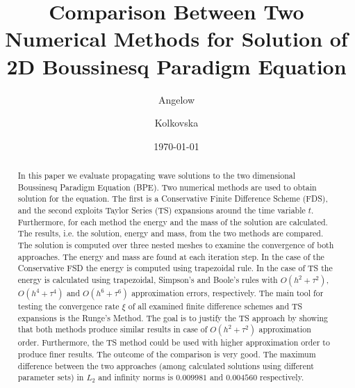 \documentclass[%
 aip,
cp,  %
 amsmath,amssymb,%
 reprint,%
]{revtex4-2}
\begin{document}
\title{Comparison Between Two Numerical Methods for Solution of 2D Boussinesq Paradigm Equation}%

\author{Angelow} %
\author{Kolkovska}%

\date{\today} %

\begin{abstract}
In this paper we evaluate propagating wave solutions to the two dimensional Boussinesq Paradigm Equation (BPE).
Two numerical methods are used to obtain solution for the equation. The first is a Conservative Finite Difference Scheme (FDS), and the second exploits Taylor Series (TS) expansions around the time variable $t$. Furthermore, for each method the energy and the mass of the solution are calculated. The results, i.e. the solution, energy and mass, from the two methods are compared.
The solution is computed over three nested meshes to examine the convergence of both approaches. The energy and mass are found at each iteration step. In the case of the Conservative FSD the energy is computed using trapezoidal rule. In the case of TS the energy is calculated using trapezoidal, Simpson's and Boole's rules with $O(h^{2} + \tau^2 )$, $O(h^{4} + \tau^4 )$ and $O(h^{6} + \tau^6 )$ approximation errors, respectively. The main tool for testing the convergence rate $\xi$ of all examined finite difference schemes and TS expansions is the Runge's Method.
The goal is to justify the TS approach by showing that both methods produce similar results in case of $O(h^{2} + \tau^2 )$ approximation order. Furthermore, the TS method could be used with higher approximation order to produce finer results. The outcome of the comparison is very good. The maximum difference between the two approaches (among calculated solutions using different parameter sets) in $L_2$ and infinity norms is $0.009981$ and $0.004560$ respectively.

\end{abstract}

\maketitle
\end{document}
